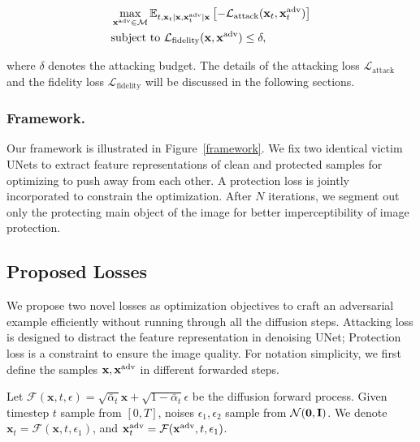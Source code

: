 \begin{equation}
    \begin{aligned}
        & \max_{\mathbf{x}^{\adv} \in \mathcal{M}}
        \mathbb{E}_{
        t,
        \mathbf{x}_t| \mathbf{x}, \mathbf{x}_t^{\adv}| \mathbf{x}}
         \left[-\mathcal{L}_\text{attack}(\mathbf{x}_t, \mathbf{x}_t^{\adv})\right] \\
        & \text{subject to } \mathcal{L}_\text{fidelity}(\mathbf{x}, \mathbf{x}^{\adv}) \leq \delta,
    \end{aligned}
    \label{eq:probelm_setting_constraint}
\end{equation}

\noindent where $\delta$ denotes the attacking budget. The details of the attacking loss $\mathcal{L}_\text{attack}$ and the fidelity loss $\mathcal{L}_\text{fidelity}$ will be discussed in the following sections.


\subsubsection{Framework.}
Our framework is illustrated in Figure~\ref{framework}. We fix two identical victim UNets to extract feature representations of clean and protected samples for optimizing to push away from each other. A protection loss is jointly incorporated to constrain the optimization. After $N$ iterations, we segment out only the protecting main object of the image for better imperceptibility of image protection.

\subsection{Proposed Losses}
We propose two novel losses as optimization objectives to craft an adversarial example efficiently without running through all the diffusion steps. Attacking loss is designed to distract the feature representation in denoising UNet; Protection loss is a constraint to ensure the image quality. For notation simplicity, we first define the samples $\mathbf{x}, \mathbf{x}^{\adv}$ in different forwarded steps. 

Let $\mathcal{F}(\mathbf{x}, t, \epsilon) = \sqrt{\bar{\alpha}_t} \mathbf{x} + \sqrt{1-\bar{\alpha}_t} \epsilon$ be the diffusion forward process. Given timestep $t$ sample from $[0, T]$, noises $\epsilon_1, \epsilon_2$ sample from $\mathcal{N}(\mathbf{0}, \mathbf{I})$. We denote $\mathbf{x}_t = \mathcal{F}(\mathbf{x}, t, \epsilon_1)$, and $\mathbf{x}^{\adv}_t = \mathcal{F}(\mathbf{x}^{\adv}, t, \epsilon_1)$.

